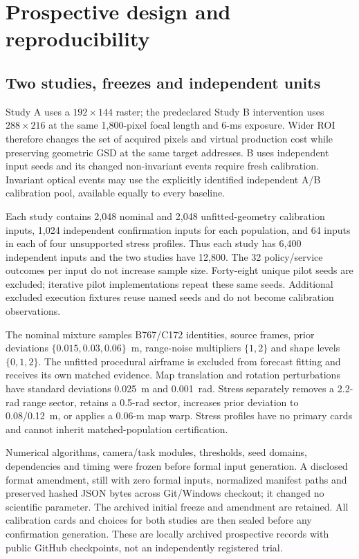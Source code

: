 \section{Prospective design and reproducibility}\label{sec:r9-design}
\subsection{Two studies, freezes and independent units}
Study A uses a $192\times144$ raster; the predeclared Study B intervention uses $288\times216$ at the same 1,800-pixel focal length and 6-ms exposure. Wider ROI therefore changes the set of acquired pixels and virtual production cost while preserving geometric GSD at the same target addresses. B uses independent input seeds and its changed non-invariant events require fresh calibration. Invariant optical events may use the explicitly identified independent A/B calibration pool, available equally to every baseline.

Each study contains 2,048 nominal and 2,048 unfitted-geometry calibration inputs, 1,024 independent confirmation inputs for each population, and 64 inputs in each of four unsupported stress profiles. Thus each study has 6,400 independent inputs and the two studies have 12,800. The 32 policy/service outcomes per input do not increase sample size. Forty-eight unique pilot seeds are excluded; iterative pilot implementations repeat these same seeds. Additional excluded execution fixtures reuse named seeds and do not become calibration observations.

The nominal mixture samples B767/C172 identities, source frames, prior deviations $\{0.015,0.03,0.06\}$~m, range-noise multipliers $\{1,2\}$ and shape levels $\{0,1,2\}$. The unfitted procedural airframe is excluded from forecast fitting and receives its own matched evidence. Map translation and rotation perturbations have standard deviations 0.025~m and 0.001~rad. Stress separately removes a 2.2-rad range sector, retains a 0.5-rad sector, increases prior deviation to 0.08/0.12~m, or applies a 0.06-m map warp. Stress profiles have no primary cards and cannot inherit matched-population certification.

Numerical algorithms, camera/task modules, thresholds, seed domains, dependencies and timing were frozen before formal input generation. A disclosed format amendment, still with zero formal inputs, normalized manifest paths and preserved hashed JSON bytes across Git/Windows checkout; it changed no scientific parameter. The archived initial freeze and amendment are retained. All calibration cards and choices for both studies are then sealed before any confirmation generation. These are locally archived prospective records with public GitHub checkpoints, not an independently registered trial.

